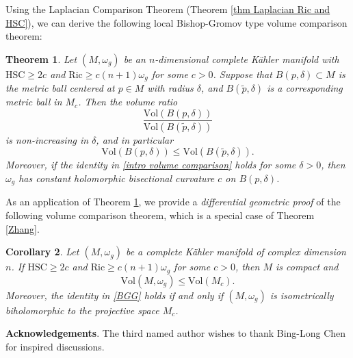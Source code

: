\documentclass[12pt,reqno]{amsart}
\theoremstyle{plain}
\newtheorem{thm}{Theorem}[section]
\newtheorem{cor}[thm]{Corollary}
\theoremstyle{definition}
\newcommand{\btheorem}{\begin{thm}}
\newcommand{\etheorem}{\end{thm}}
\newcommand{\bcorollary}{\begin{cor}}
\newcommand{\ecorollary}{\end{cor}}
\newcommand{\beq}{\begin{equation}}
\newcommand{\eeq}{\end{equation}}
\renewcommand{\tilde}{\widetilde}
\renewcommand{\>}{\rightarrow}
\numberwithin{equation}{section} %
\newcommand{\om}{\omega}
\renewcommand{\leq}{\leqslant}
\renewcommand{\geq}{\geqslant}
\begin{document}
\noindent Using the Laplacian Comparison Theorem (Theorem \ref{thm Laplacian Ric and HSC}), we can derive the following local Bishop-Gromov type volume comparison theorem:

\btheorem\label{thm volume Ric and HSC}
Let $(M, \omega_g)$ be an $n$-dimensional  complete K\"ahler manifold with $\mathrm{HSC}\geq 2c$ and $\mathrm{Ric}\geq c(n+1)\om_g$ for some $c>0$.
Suppose that $B(p,\delta)\subset M$ is the metric ball centered at $p\in M$ with radius $\delta$, and ${B}(\tilde{p},\delta)$ is a corresponding metric ball in $M_{c}$.
Then the volume ratio
\beq
\frac{\mathrm{Vol}(B(p,\delta))}{\mathrm{Vol}(B(\tilde{p},\delta))}
\eeq
is non-increasing in $\delta$, and in particular
\beq \mathrm{Vol}(B(p,\delta))\leq  \mathrm{Vol}(B(\tilde p,\delta)).\label{intro volume comparison}\eeq
Moreover, if the identity in \eqref{intro volume comparison} holds for some $\delta>0$, then $\omega_g$ has constant holomorphic bisectional curvature $c$ on $B(p,\delta)$.
\etheorem




\noindent As an application of Theorem \ref{thm volume Ric and HSC}, we provide a \emph{differential geometric proof} of the following volume comparison theorem, which is a special case of Theorem \ref{Zhang}.
\bcorollary \label{cor volume Ric and HSC}
Let $(M,\om_g)$ be a complete K\"ahler manifold of complex dimension $n$.
If $\mathrm{HSC}\geq 2c$ and $\mathrm{Ric}\geq c(n+1)\om_g$ for some $c>0$, then $M$ is compact and  \beq \mathrm{Vol}(M,\omega_g)\leq \mathrm{Vol}(M_c).\label{BGG}\eeq
Moreover, the identity in \eqref{BGG} holds if and only if $(M,\omega_g)$ is isometrically biholomorphic to the projective space $M_c$.
\ecorollary

\noindent\textbf{Acknowledgements}.  The third named author wishes to thank Bing-Long Chen for inspired discussions.

\baselineskip
\end{document}
